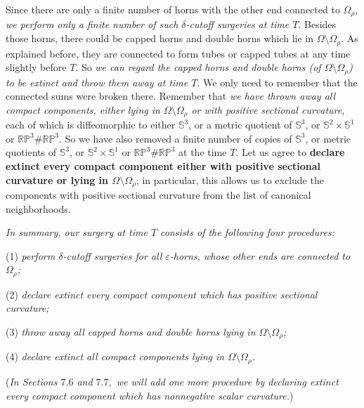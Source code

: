 Since there are only a finite number of horns with the other end
connected to $\Omega_\rho$, \emph{we perform only a finite number
of such $\delta$-cutoff surgeries at time $T$}. Besides those
horns, there could be capped horns and double horns which lie in
$\Omega \setminus \Omega_\rho$. As explained before, they are
connected to form tubes or capped tubes at any time slightly
before $T$. So \emph{we can regard the capped horns and double
horns (of $\Omega \setminus \Omega_\rho$) to be extinct and throw
them away at time $T$}. We only need to remember that the
connected sums were broken there. Remember that \emph{we have
thrown away all compact components, either lying in $\Omega
\setminus\Omega_\rho$ or with positive sectional curvature}, each
of which is diffeomorphic to either $\mathbb{S}^3$, or a metric
quotient of $\mathbb{S}^3$, or $\mathbb{S}^2 \times \mathbb{S}^1$
or $\mathbb{RP}^3\#\mathbb{RP}^3$. So we have also removed a
finite number of copies of $\mathbb{S}^3$, or metric quotients of
$\mathbb{S}^3$, or $\mathbb{S}^2 \times \mathbb{S}^1$ or
$\mathbb{RP}^3\#\mathbb{RP}^3$ at the time $T$. Let us agree to
\textbf{declare extinct every compact component either with
positive sectional curvature or lying in $\Omega
\setminus\Omega_\rho$}; in particular, this allows us to exclude
the components with positive sectional curvature from the list of
canonical neighborhoods.

\medskip
\emph{In summary, our surgery at time $T$ consists of the
following four procedures:}

(1) \emph{perform $\delta$-cutoff surgeries for all
$\varepsilon$-horns, whose other ends are  connected to
$\Omega_\rho$;}

(2) \emph{declare extinct every compact component which has
positive sectional curvature;}

(3) \emph{throw away all capped horns and double horns lying in
$\Omega \setminus \Omega_\rho$;}

(4) \emph{declare extinct all compact components lying in $\Omega
\setminus\Omega_\rho$.}

\medskip \noindent
({\it In Sections $7.6$ and $7.7,$ we will add one more procedure
by declaring extinct every compact component which has nonnegative
scalar curvature.})

